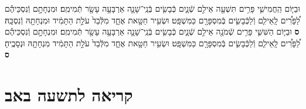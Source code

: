 \documentclass[twoside, openany, parskip=half, 11pt]{book}
\begin{document}
\begin{footnotesize}
\begin{multicols}{2}
וּבַיּ֧וֹם הַֽחֲמִישִׁ֛י פָּרִ֥ים תִּשְׁעָ֖ה אֵילִ֣ם שְֿׁנָ֑יִם כְּֿבָשִׂ֧ים בְּֿנֵֽי־שָׁנָ֛ה אַרְבָּעָ֥ה עָשָׂ֖ר תְּֿמִימִֽם׃ וּמִנְחָתָ֣ם וְֿנִסְכֵּיהֶ֡ם לַ֠פָּרִ֠ים לָֽאֵילִ֧ם וְֿלַכְּֿבָשִׂ֛ים בְּֿמִסְפָּרָ֖ם כַּמִּשְׁפָּֽט׃ וּשְׂעִ֥יר חַטָּ֖את אֶחָ֑ד מִלְּֿבַד֙ עֹלַ֣ת הַתָּמִ֔יד וּמִנְחָתָ֖הּ וְֿנִסְכָּֽהּ׃ \textbf{ס}
וּבַיּ֧וֹם הַשִּׁשִּׁ֛י פָּרִ֥ים שְֿׁמֹנָ֖ה אֵילִ֣ם שְֿׁנָ֑יִם כְּֿבָשִׂ֧ים בְּֿנֵֽי־שָׁנָ֛ה אַרְבָּעָ֥ה עָשָׂ֖ר תְּֿמִימִֽם׃ וּמִנְחָתָ֣ם וְֿנִסְכֵּיהֶ֡ם לַ֠פָּרִ֠ים לָֽאֵילִ֧ם וְֿלַכְּֿבָשִׂ֛ים בְּֿמִסְפָּרָ֖ם כַּמִּשְׁפָּֽט׃ וּשְׂעִ֥יר חַטָּ֖את אֶחָ֑ד מִלְּֿבַד֙ עֹלַ֣ת הַתָּמִ֔יד מִנְחָתָ֖הּ וּנְסָכֶֽיהָ׃ \textbf{ס}

\end{multicols}

\section[תשעה באב]{קריאה לתשעה באב}




\end{footnotesize}
\end{document}
